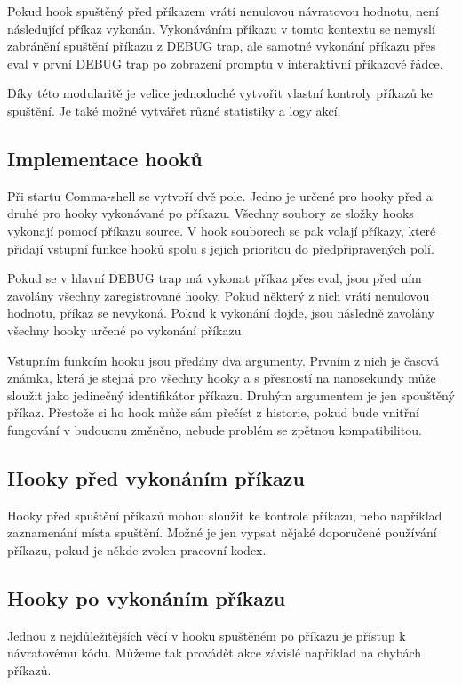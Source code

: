 \documentclass[thesis=M,czech]{FITthesis}[2012/06/26]
\begin{document}
Pokud hook spuštěný před příkazem vrátí nenulovou návratovou hodnotu, není následující příkaz vykonán. Vykonáváním příkazu v tomto kontextu se nemyslí zabránění spuštění příkazu z DEBUG trap, ale samotné vykonání příkazu přes eval v první DEBUG trap po zobrazení promptu v interaktivní příkazové řádce.

Díky této modularitě je velice jednoduché vytvořit vlastní kontroly příkazů ke spuštění. Je také možné vytvářet různé statistiky a logy akcí.


\subsection{Implementace hooků}

Při startu Comma-shell se vytvoří dvě pole. Jedno je určené pro hooky před a druhé pro hooky vykonávané po příkazu. Všechny soubory ze složky hooks vykonají pomocí příkazu source. V hook souborech se pak volají příkazy, které přidají vstupní funkce hooků spolu s jejich prioritou do předpřipravených polí.

Pokud se v hlavní DEBUG trap má vykonat příkaz přes eval, jsou před ním zavolány všechny zaregistrované hooky. Pokud některý z nich vrátí nenulovou hodnotu, příkaz se nevykoná. Pokud k vykonání dojde, jsou následně zavolány všechny hooky určené po vykonání příkazu.

Vstupním funkcím hooku jsou předány dva argumenty. Prvním z nich je časová známka, která je stejná pro všechny hooky a s přesností na nanosekundy může sloužit jako jedinečný identifikátor příkazu. Druhým argumentem je jen spouštěný příkaz. Přestože si ho hook může sám přečíst z historie, pokud bude vnitřní fungování v budoucnu změněno, nebude problém se zpětnou kompatibilitou.

\subsection{Hooky před vykonáním příkazu}

Hooky před spuštění příkazů mohou sloužit ke kontrole příkazu, nebo například zaznamenání místa spuštění. Možné je jen vypsat nějaké doporučené používání příkazu, pokud je někde zvolen pracovní kodex.

\subsection{Hooky po vykonáním příkazu}

Jednou z nejdůležitějších věcí v hooku spuštěném po příkazu je přístup k návratovému kódu. Můžeme tak provádět akce závislé například na chybách příkazů.
\end{document}

